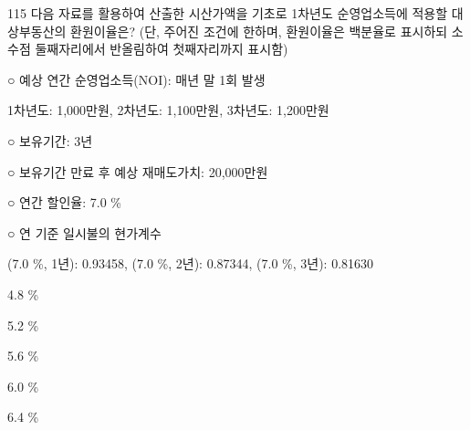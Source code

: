 \begin{question}{115}
다음 자료를 활용하여 산출한 시산가액을 기초로 1차년도 순영업소득에 적용할 대상부동산의 환원이율은? (단, 주어진 조건에 한하며, 환원이율은 백분율로 표시하되 소수점 둘째자리에서 반올림하여 첫째자리까지 표시함)
\begin{framedtext}
○ 예상 연간 순영업소득(NOI): 매년 말 1회 발생 \par
1차년도: 1,000만원, 2차년도: 1,100만원, 3차년도: 1,200만원 \par
○ 보유기간: 3년 \par
○ 보유기간 만료 후 예상 재매도가치: 20,000만원 \par
○ 연간 할인율: 7.0 \% \par
○ 연 기준 일시불의 현가계수 \par
(7.0 \%, 1년): 0.93458, (7.0 \%, 2년): 0.87344, (7.0 \%, 3년): 0.81630 \par
\end{framedtext}
\begin{choices}
  \item 4.8 \%
  \item 5.2 \%
  \item 5.6 \%
  \item 6.0 \%
  \item 6.4 \%
\end{choices}
\end{question}
